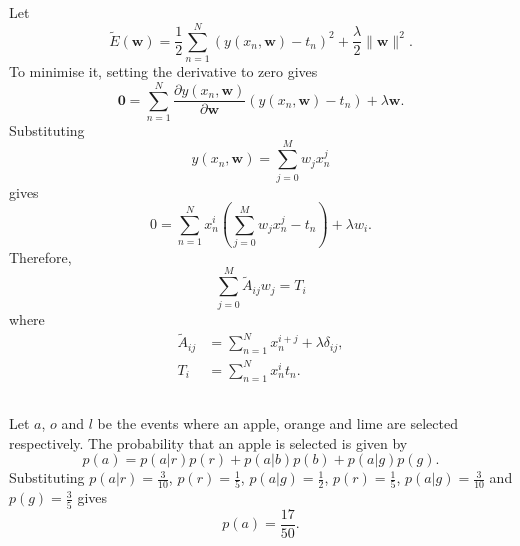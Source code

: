 \subsection{}
\label{1.2}
Let
%
\begin{equation}
\tilde{E}(\mathbf{w}) = \frac{1}{2} \sum_{n = 1}^{N} \left( y(x_n, \mathbf{w}) - t_n \right) ^ 2 + \frac{\lambda}{2} \lVert \mathbf{w} \rVert ^ 2.
\end{equation}
%
To minimise it, setting the derivative to zero gives
%
\begin{equation}
\mathbf{0} = \sum_{n = 1}^{N} \frac{\partial y(x_n, \mathbf{w})}{\partial \mathbf{w}} \left( y(x_n, \mathbf{w}) - t_n \right) + \lambda \mathbf{w}.
\end{equation}
%
Substituting 
%
\begin{equation}
y(x_n, \mathbf{w}) = \sum_{j = 0}^{M} w_j x_n^j
\end{equation}
%
gives
%
\begin{equation}
0 = \sum_{n = 1}^{N} x_n^i \left( \sum_{j = 0}^{M} w_j x_n^j - t_n \right) + \lambda w_i.
\end{equation}
%
Therefore,
%
\begin{equation}
\sum_{j = 0}^{M} \tilde{A}_{ij} w_j = T_i
\end{equation}
%
where
%
\begin{equation}
\begin{aligned}
\tilde{A}_{ij} &= \sum_{n = 1}^{N} x_n^{i + j} + \lambda \delta_{ij}, \\
T_i &= \sum_{n = 1}^{N} x_n^i t_n.
\end{aligned}
\end{equation}


\subsection{}
\label{1.3}
Let $a$, $o$ and $l$ be the events where an apple, orange and lime are selected respectively.
The probability that an apple is selected is given by
%
\begin{equation}
p(a) = p(a | r) p(r) + p(a | b) p(b) + p(a | g) p(g).
\end{equation}
%
Substituting $p(a | r) = \frac{3}{10}$, $p(r) = \frac{1}{5}$, $p(a | g) = \frac{1}{2}$, $p(r) = \frac{1}{5}$, $p(a | g) = \frac{3}{10}$ and $p(g) = \frac{3}{5}$ gives
%
\begin{equation}
p(a) = \frac{17}{50}.
\end{equation}
%

